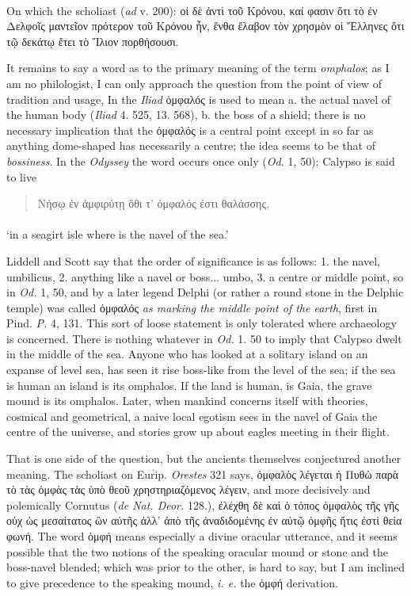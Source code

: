 \documentclass[a4paper, 11pt, oneside, polutonikogreek, english]{article}
\begin{document}
\paragraph{}
On which the scholiast (\emph{ad} v. 200): οἱ δὲ ἀντὶ τοῦ Κρόνου, καί φασιν ὅτι τὸ ἐν Δελφοῖς μαντεῖον πρότερον τοῦ Κρόνου ἦν, ἔνθα ἔλαβον τὸν χρησμὸν οἱ Ἕλληνες ὅτι τῷ δεκάτῳ ἔτει τὸ Ἴλιον πορθήσουσι.

It remains to say a word as to the primary meaning of the term \emph{omphalos}; as I am no philologist, I can only approach the question from the point of view of tradition and usage, In the \emph{Iliad} ὀμφαλός is used to mean a. the actual navel of the human body (\emph{Iliad} 4. 525, 13. 568), b. the boss of a shield; there is no necessary implication that the ὀμφαλός is a central point except in so far as anything dome-shaped has necessarily a centre; the idea seems to be that of \emph{bossiness}. In the \emph{Odyssey} the word occurs once only (\emph{Od.} 1, 50); Calypso is said to live
\begin{quotation}
Νήσῳ ἐν ἀμφιρύτῃ ὅθι τ' ὀμφαλός ἐστι θαλάσσης,
\end{quotation}
\paragraph{}
`in a seagirt isle where is the navel of the sea.'

Liddell and Scott say that the order of significance is as follows: 1. the navel, umbilicus, 2. anything like a navel or boss... umbo, 3. a centre or middle point, so in \emph{Od.} 1, 50, and by a later legend Delphi (or rather a round stone in the Delphic temple) was called ὀμφαλός \emph{as marking the middle point of the earth}, first in Pind. \emph{P.} 4, 131. This sort of loose statement is only tolerated where archaeology is concerned. There is nothing whatever in \emph{Od.} 1. 50 to imply that Calypso dwelt in the middle of the sea. Anyone who has looked at a solitary island on an expanse of level sea, has seen it rise boss-like from the level of the sea; if the sea is human an island is its omphalos. If the land is human, is Gaia, the grave mound is its omphalos. Later, when mankind concerns itself with theories, cosmical and geometrical, a naive local egotism sees in the navel of Gaia the centre of the universe, and stories grow up about eagles meeting in their flight.

That is one side of the question, but the ancients themselves conjectured another meaning. The scholiast on Eurip. \emph{Orestes} 321 says, ὀμφαλὸς λέγεται ἡ Πυθὼ παρὰ τὸ τὰς ὀμφὰς τὰς ὑπὸ θεοῦ χρηστηριαζόμενος λέγειν, and more decisively and polemically Cornutus (\emph{de Nat. Deor.} 128.), ἐλέχθη δὲ καὶ ὁ τόπος ὀμφαλὸς τῆς γῆς οὐχ ὡς μεσαίτατος ὢν αὐτῆς ἀλλ' ἀπὸ τῆς ἀναδιδομένης ἐν αὐτῷ ὀμφῆς ἥτις ἐστὶ θεία φωνή. The word ὀμφή means especially a divine oracular utterance, and it seems possible that the two notions of the speaking oracular mound or stone and the boss-navel blended; which was prior to the other, is hard to say, but I am inclined to give precedence to the speaking mound, \emph{i. e.} the ὀμφή derivation.
\end{document}
